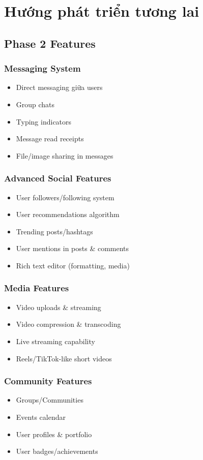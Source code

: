 \section{Hướng phát triển tương lai}

\subsection{Phase 2 Features}

\subsubsection{Messaging System}
\begin{itemize}
    \item Direct messaging giữa users
    \item Group chats
    \item Typing indicators
    \item Message read receipts
    \item File/image sharing in messages
\end{itemize}

\subsubsection{Advanced Social Features}
\begin{itemize}
    \item User followers/following system
    \item User recommendations algorithm
    \item Trending posts/hashtags
    \item User mentions in posts \& comments
    \item Rich text editor (formatting, media)
\end{itemize}

\subsubsection{Media Features}
\begin{itemize}
    \item Video uploads \& streaming
    \item Video compression \& transcoding
    \item Live streaming capability
    \item Reels/TikTok-like short videos
\end{itemize}

\subsubsection{Community Features}
\begin{itemize}
    \item Groups/Communities
    \item Events calendar
    \item User profiles \& portfolio
    \item User badges/achievements
\end{itemize}

